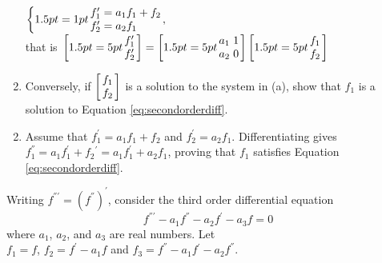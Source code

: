 \begin{multicols}{2}
\begin{ex}
\begin{enumerate}[label={\alph*.}]
$
\left\lbrace \arraycolsep=1pt
\begin{array}{l}
f_1^{\prime} = a_1f_1 + f_2 \\
f_2^{\prime} = a_2f_1
\end{array}, \right.  $ \\ that is $ \left. \leftB \arraycolsep=5pt \begin{array}{c}
f_1^{\prime} \\
f_2^{\prime}
\end{array}\rightB = \leftB \arraycolsep=5pt   \begin{array}{cc}
a_1 & 1 \\
a_2 & 0 
\end{array}\rightB \leftB \arraycolsep=5pt  \begin{array}{c}
f_1 \\
f_2
\end{array}\rightB \right.
$


\item Conversely, if $\leftB \begin{array}{c}
f_1 \\
f_2
\end{array}\rightB$
 is a solution to the system in (a), show that $f_{1}$ is a solution to Equation \ref{eq:secondorderdiff}.

\end{enumerate}
\begin{sol}
\begin{enumerate}[label={\alph*.}]
\setcounter{enumi}{1}
\item  Assume that $f_{1}^{\prime} = a_{1}f_{1} + f_{2}$ and $f_{2}^{\prime} = a_{2}f_{1}$. Differentiating gives $f_{1}^{\dprime} = a_{1}f_{1}^{\prime} + f_{2}{}^{\prime} = a_{1}f_{1}^{\prime} + a_{2}f_{1}$, proving that $f_{1}$ satisfies Equation \ref{eq:secondorderdiff}.

\end{enumerate}
\end{sol}
\end{ex}

\begin{ex} \label{ex:3_5_7}
Writing $f^{\dprime\prime} = (f^\dprime)^{\prime}$, consider the third order differential equation
\begin{equation*}
f^{\dprime\prime} - a_1 f^{\dprime} - a_2 f^{\prime} - a_3 f = 0
\end{equation*}
where $a_{1}$, $a_{2}$, and $a_{3}$ are real numbers. Let \\ $f_{1} = f$, $f_{2} = f^{\prime}- a_{1}f$ and $f_{3} = f^\dprime - a_{1}f{}^{\prime} - a_{2}f^\dprime$.



\end{ex}
\end{multicols}
